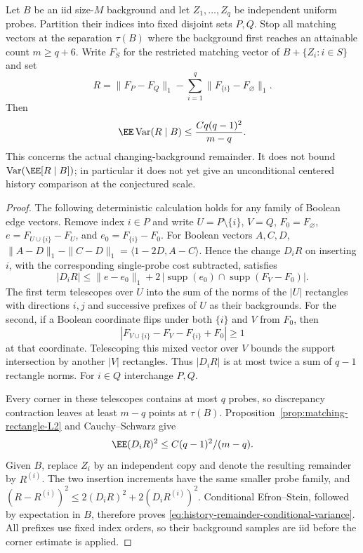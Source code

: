 \documentclass[11pt,letterpaper]{article}
\begin{document}
\begin{corollary}
\label{cor:history-remainder-conditional-variance}
Let $B$ be an iid size-$M$ background and let $Z_1,\ldots,Z_q$
be independent uniform probes. Partition their indices into
fixed disjoint sets $P,Q$. Stop all matching vectors at the
separation $\tau(B)$ where the background first reaches an
attainable count $m\ge q+6$. Write $F_S$ for the restricted
matching vector of $B+\{Z_i:i\in S\}$ and set
\[
 R=\|F_P-F_Q\|_1-
                 \sum_{i=1}^q\|F_{\{i\}}-F_\varnothing\|_1.
\]
Then
\begin{equation}\label{eq:history-remainder-conditional-variance}
 \EE\operatorname{Var}(R\mid B)
                \le \frac{Cq(q-1)^2}{m-q}.
\end{equation}
This concerns the actual changing-background remainder.
It does not bound $\operatorname{Var}(\EE[R\mid B])$;
in particular it does not yet give an unconditional centered
history comparison at the conjectured scale.
\end{corollary}
\begin{proof}
The following deterministic calculation holds for any family
of Boolean edge vectors. Remove index $i\in P$ and write
$U=P\setminus\{i\}$, $V=Q$, $F_0=F_\varnothing$,
$e=F_{U\cup\{i\}}-F_U$, and $e_0=F_{\{i\}}-F_0$.
For Boolean vectors $A,C,D$,
$\|A-D\|_1-\|C-D\|_1=\langle1-2D,A-C\rangle$.
Hence the change $D_iR$ on inserting $i$, with the corresponding
single-probe cost subtracted, satisfies
\[
 |D_iR|\le\|e-e_0\|_1
       +2\,|\operatorname{supp}(e_0)
                       \cap\operatorname{supp}(F_V-F_0)|.
\]
The first term telescopes over $U$ into the sum of the norms
of the $|U|$ rectangles with directions $i,j$ and successive
prefixes of $U$ as their backgrounds. For the second, if a
Boolean coordinate flips under both $\{i\}$ and $V$ from
$F_0$, then
\[
 |F_{V\cup\{i\}}-F_V-F_{\{i\}}+F_0|\ge1
\]
at that coordinate. Telescoping this mixed vector over $V$
bounds the support intersection by another $|V|$ rectangles.
Thus $|D_iR|$ is at most twice a sum of $q-1$ rectangle norms.
For $i\in Q$ interchange $P,Q$.

Every corner in these telescopes contains at most $q$ probes,
so discrepancy contraction leaves at least $m-q$ points at
$\tau(B)$. Proposition~\ref{prop:matching-rectangle-L2} and
Cauchy--Schwarz give
\[
 \EE(D_iR)^2\le C(q-1)^2/(m-q).
\]
Given $B$, replace $Z_i$ by an independent copy and denote
the resulting remainder by $R^{(i)}$. The two insertion
increments have the same smaller probe family, and
$(R-R^{(i)})^2\le2(D_iR)^2+2(D_iR^{(i)})^2$.
Conditional Efron--Stein, followed by expectation in $B$,
therefore proves \eqref{eq:history-remainder-conditional-variance}.
All prefixes use fixed index orders, so their background
samples are iid before the corner estimate is applied.
\end{proof}
\end{document}
